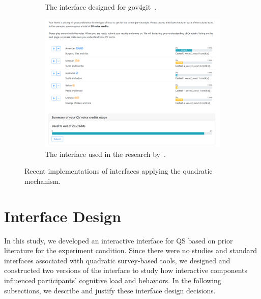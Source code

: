 \begin{figure}[ht]
\begin{subfigure}[b]{0.3\textwidth}
        \caption{The interface designed for gov4git~\cite{Gov4gitDecentralizedPlatform2023}.}
        \label{fig:gov4gitInterface}
    \end{subfigure}
    \begin{subfigure}[b]{0.3\textwidth}
        \centering
        \includegraphics[width=\textwidth]{content/image/curr_interface/cheng_qv.png}
        \caption{The interface used in the research by~\textcite{chengCanShowWhat2021}.}
        \label{fig:chengInterface}
    \end{subfigure}
    \caption{Recent implementations of interfaces applying the quadratic mechanism.}
    \label{fig:qv_interface_external}
\end{figure}

\section{Interface Design}
\label{sec:interfaceDesign}
In this study, we developed an interactive interface for QS based on prior literature for the experiment condition. Since there were no studies and standard interfaces associated with quadratic survey-based tools, we designed and constructed two versions of the interface to study how interactive components influenced participants' cognitive load and behaviors. In the following subsections, we describe and justify these interface design decisions.

